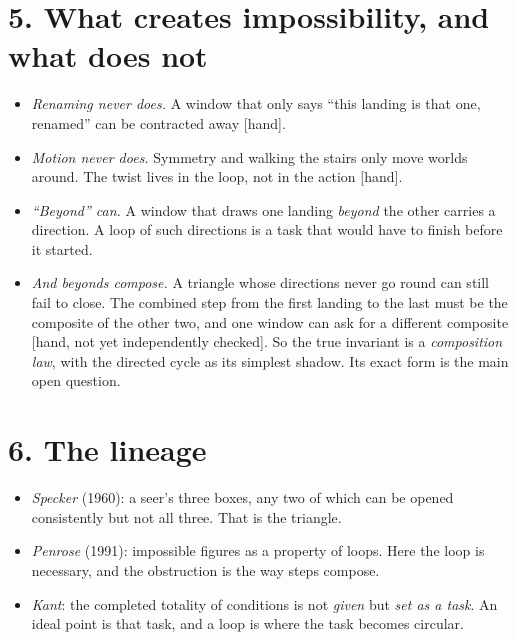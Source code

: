 \documentclass[11pt]{article}
\newcommand{\st}[1]{\textsf{\small[#1]}}
\begin{document}
\section*{5. What creates impossibility, and what does not}
\begin{itemize}[nosep]
  \item \emph{Renaming never does.} A window that only says ``this landing is
    that one, renamed'' can be contracted away \st{hand}.
  \item \emph{Motion never does.} Symmetry and walking the stairs only move
    worlds around. The twist lives in the loop, not in the action \st{hand}.
  \item \emph{``Beyond'' can.} A window that draws one landing \emph{beyond} the
    other carries a direction. A loop of such directions is a task that would
    have to finish before it started.
  \item \emph{And beyonds compose.} A triangle whose directions never go round
    can still fail to close. The combined step from the first landing to the
    last must be the composite of the other two, and one window can ask for a
    different composite \st{hand, not yet independently checked}. So the true
    invariant is a \emph{composition law}, with the directed cycle as its
    simplest shadow. Its exact form is the main open question.
\end{itemize}

\section*{6. The lineage}
\begin{itemize}[nosep]
  \item \emph{Specker} (1960): a seer's three boxes, any two of which can be
    opened consistently but not all three. That is the triangle.
  \item \emph{Penrose} (1991): impossible figures as a property of loops. Here
    the loop is necessary, and the obstruction is the way steps compose.
  \item \emph{Kant}: the completed totality of conditions is not \emph{given}
    but \emph{set as a task}. An ideal point is that task, and a loop is where
    the task becomes circular.
\end{itemize}
\end{document}
